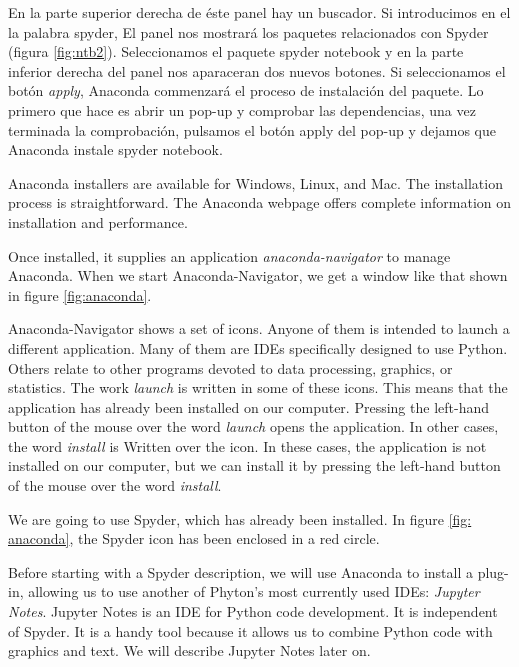 \begin{paracol}{2}
 En la parte superior derecha de éste panel hay un buscador. Si introducimos en el la palabra spyder, El panel nos mostrará los paquetes relacionados con Spyder (figura \ref{fig:ntb2}). Seleccionamos el paquete spyder notebook y en la parte inferior derecha del panel nos aparaceran dos nuevos botones. Si seleccionamos el botón \emph{apply}, Anaconda commenzará el proceso de instalación del paquete. Lo primero que hace es abrir un pop-up y comprobar las dependencias, una vez terminada la comprobación, pulsamos el botón apply del pop-up y dejamos que Anaconda instale spyder notebook.
 

 \switchcolumn
 Anaconda installers are available for Windows, Linux, and Mac. The installation process is straightforward. The Anaconda webpage offers complete information on installation and performance.

 Once installed, it supplies an application \emph{anaconda-navigator} to manage Anaconda. When we start Anaconda-Navigator, we get a window like that shown in figure \ref{fig:anaconda}.

 Anaconda-Navigator shows a set of icons. Anyone of them is intended to launch a different application. Many of them are IDEs specifically designed to use Python. Others relate to other programs devoted to data processing, graphics, or statistics. The work \emph{launch} is written in some of these icons. This means that the application has already been installed on our computer. Pressing the left-hand button of the mouse over the word \emph{launch} opens the application. In other cases, the word \emph{install} is Written over the icon. In these cases, the application is not installed on our computer, but we can install it by pressing the left-hand button of the mouse over the word \emph{install}.

 We are going to use Spyder, which has already been installed. In figure \ref{fig: anaconda}, the Spyder icon has been enclosed in a red circle.

 Before starting with a Spyder description, we will use Anaconda to install a plug-in, allowing us to use another of Phyton's most currently used IDEs: \emph{Jupyter Notes}. Jupyter Notes is an IDE for Python code development.  It is independent of Spyder. It is a handy tool because it allows us to combine Python code with graphics and text. We will describe Jupyter Notes later on.


\end{paracol}
